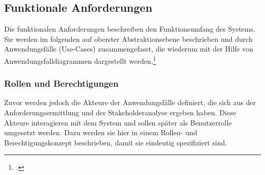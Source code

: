 \subsection{Funktionale Anforderungen}
Die funktionalen Anforderungen beschreiben den Funktionsumfang des Systems. Sie werden im folgenden auf oberster Abstraktionsebene beschrieben und durch Anwendungsfälle (Use-Cases) zusammengefasst, die wiederum mit der Hilfe von Anwendungsfalldiagrammen dargestellt werden.\footcite[Vgl.][S. 496]{balzert}

\subsubsection{Rollen und Berechtigungen}
\label{kap:RuB}
Zuvor werden jedoch die Akteure der Anwendungsfälle definiert, die sich aus der Anforderungsermittlung und der Stakeholderanalyse ergeben haben. Diese Akteure interagieren mit dem System und sollen später als Benutzerrolle umgesetzt werden. Dazu werden sie hier in einem Rollen- und Berechtigungskonzept beschrieben, damit sie eindeutig spezifiziert sind.

